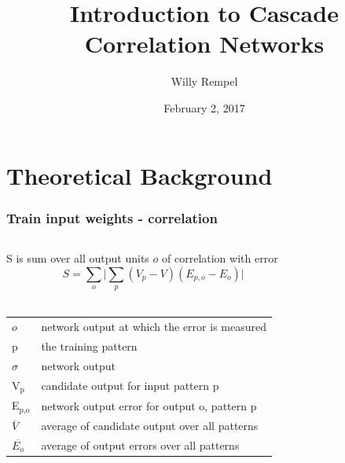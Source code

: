 \documentclass{beamer}
\title{Introduction to Cascade Correlation Networks}
\author{Willy Rempel}
\date{February 2, 2017}
\begin{document}
\frame{\titlepage}
\section[Outline]{}
\frame{\tableofcontents}

\section{Theoretical Background}

\begin{frame}
  \frametitle{Train input weights - correlation}
	\begin{columns}[t]
		\begin{column}[t]{0.5\textwidth}
      \small{S is sum over all output units $\mathit{o}$ of correlation with error}
      $$ S = \sum_{o} \lvert \sum_{p} (V_{p} - V) (E_{p,o} - E_{o}) \rvert $$
     \\  
      \begin{center}
        \begin{tabular}{ll}
          \(\mathit{o}\) & \tiny{network output at which the error is measured} \\
          p & \tiny{the training pattern} \\
          \(\sigma\) & \tiny{network output} \\
          V\(_{\text{p}}\) & \tiny{candidate output for input pattern p}   \\
          E\(_{\text{p,o}}\) & \tiny{network output error for output o, pattern p} \\
          \(\overline{V}\) & \tiny{average of candidate output over all patterns} \\
          \(\overline{E_{o}}\) & \tiny{average of output errors over all patterns} \\
        \end{tabular}
      \end{center}
		\end{column}
		\begin{column}{0.5\textwidth}
      \begin{figure}
        \centering

\end{figure}
\end{column}
\end{columns}
\end{frame}
\end{document}
